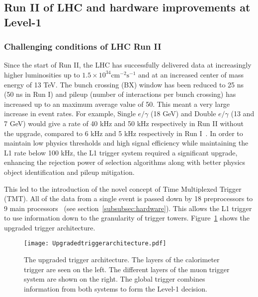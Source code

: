 \documentclass[a4paper,11pt]{article}
\begin{document}
\subsection{Run II of LHC and hardware improvements at Level-1} 
\subsubsection{Challenging conditions of LHC Run II}
Since the start of Run II, the LHC has successfully delivered data at increasingly higher luminosities up to $1.5 \times 10^{34} \mathrm{cm^{-2}s^{-1}}$ and at an increased center of mass energy of 13 TeV. The bunch crossing (BX) window has been reduced to 25 ns (50 ns in Run I) and pileup (number of interactions per bunch crossing) has increased up to an maximum average value of 50. This meant a very large increase in event rates. For example, Single $e/\gamma$ (18 GeV) and Double $e/\gamma$ (13 and 7 GeV) would give a rate of 40 kHz and 50 kHz respectively in Run II without the upgrade, compared to 6 kHz and 5 kHz respectively in Run I~\cite{c}. In order to maintain low physics thresholds and high signal efficiency  while maintaining the L1 rate below 100 kHz, the L1 trigger system required a significant upgrade, enhancing  the rejection power of selection algorithms along with better physics object identification and  pileup mitigation.

This led to the introduction of the novel concept of Time Multiplexed Trigger (TMT). All of the data from a single event is passed down by 18 preprocessors to 9 main processors~\cite{d} (see section~\ref{subsubsec:hardware}). This allows the L1 trigger to use information down to the granularity of trigger towers. Figure~\ref{fig:j} shows the upgraded trigger architecture.
\begin{figure}[htbp]
\centering
\texttt{[image: Upgradedtriggerarchitecture.pdf]}
\qquad
\caption{\label{fig:j} The upgraded trigger architecture. The layers of the calorimeter trigger are seen on the left. The different layers of the muon trigger system are shown on the right. The global trigger combines information from both systems to form the Level-1 decision.  }
\end{figure}
\end{document}
